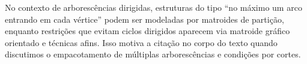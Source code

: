 \documentclass[12pt,a4paper]{article}
\begin{document}
No contexto de arborescências dirigidas, estruturas do tipo “no máximo um arco entrando em cada vértice” podem ser modeladas por matroides de partição, enquanto restrições que evitam ciclos dirigidos aparecem via matroide gráfico orientado e técnicas afins. Isso motiva a citação no corpo do texto quando discutimos o empacotamento de múltiplas arborescências e condições por cortes.




\bigskip
\printbibliography
\end{document}
